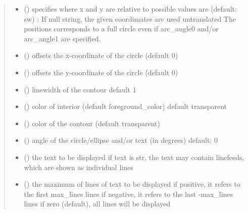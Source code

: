 \documentclass[letterpaper,10pt,english]{sphinxmanual}
\begin{document}
\begin{fulllineitems}
\begin{quote}
\begin{description}
\begin{itemize}
\item {} 
 () \textendash{} specifies where x and y are relative to 
possible values are (default: sw) : 
If null string, the given coordimates are used untranslated 
The positions corresponds to a full circle even if arc\_angle0 and/or arc\_angle1 are specified.

\item {} 
 () \textendash{} offsets the x-coordinate of the circle (default 0)

\item {} 
 () \textendash{} offsets the y-coordinate of the circle (default 0)

\item {} 
 () \textendash{} linewidth of the contour 
default 1

\item {} 
 () \textendash{} color of interior (default foreground\_color) 
default transparent

\item {} 
 () \textendash{} color of the contour (default transparent)

\item {} 
 () \textendash{} angle of the circle/ellipse and/or text (in degrees) 
default: 0

\item {} 
 (\sphinxstyleliteralemphasis{, }) \textendash{} the text to be displayed 
if text is str, the text may contain linefeeds, which are shown as individual lines

\item {} 
 () \textendash{} the maximum of lines of text to be displayed 
if positive, it refers to the first max\_lines lines 
if negative, it refers to the last -max\_lines lines 
if zero (default), all lines will be displayed


\end{itemize}
\end{description}
\end{quote}
\end{fulllineitems}
\end{document}
